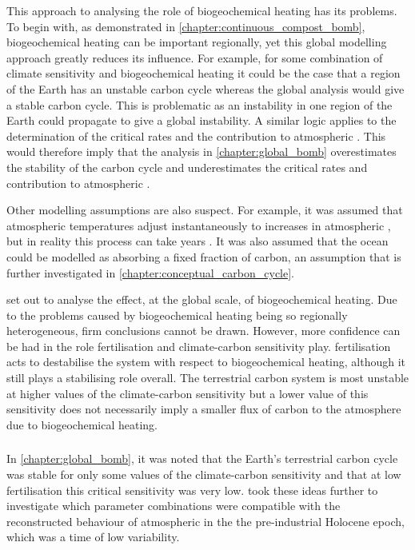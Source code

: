 This approach to analysing the role of biogeochemical heating has its problems. To begin with, as demonstrated in \cref{chapter:continuous_compost_bomb}, biogeochemical heating
can be important regionally, yet this global modelling approach greatly reduces its influence. For example, for some combination of climate sensitivity and biogeochemical heating
it could be the case that a region of the Earth has an unstable carbon cycle whereas the global analysis would give a stable carbon cycle. This is problematic as an instability in one
region of the Earth could propagate to give a global instability. A similar logic applies to the determination of the critical rates and the contribution to atmospheric .
This would therefore imply that the analysis in \cref{chapter:global_bomb} overestimates the stability of the carbon cycle and underestimates the critical rates and contribution to atmospheric
.

Other modelling assumptions are also suspect. For example, it was assumed that atmospheric temperatures adjust instantaneously to increases in atmospheric , but in
reality this process can take years \parencite{Rugenstein2019}. It was also assumed that the ocean could be modelled as absorbing a fixed fraction of carbon, an assumption that is
further investigated in \cref{chapter:conceptual_carbon_cycle}.

 set out to analyse the effect, at the global scale, of biogeochemical heating. Due to the problems caused by biogeochemical heating
being so regionally heterogeneous, firm conclusions cannot be drawn. However, more confidence can be had in the role  fertilisation and climate-carbon
sensitivity play.  fertilisation acts to destabilise the system with respect to biogeochemical heating, although it still plays a stabilising role
overall. The terrestrial carbon system is most unstable at higher values of the climate-carbon sensitivity but a lower value of this sensitivity does not
necessarily imply a smaller flux of carbon to the atmosphere due to biogeochemical heating.

\subsubsection{}

In \cref{chapter:global_bomb}, it was noted that the Earth's terrestrial carbon cycle was stable for only some values of the climate-carbon sensitivity and that at low
 fertilisation this critical sensitivity was very low.  took these ideas further to investigate which parameter combinations
were compatible with the reconstructed behaviour of atmospheric  in the the pre-industrial Holocene epoch, which was a time of low  variability.

